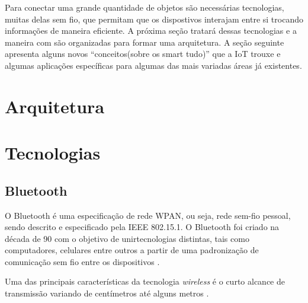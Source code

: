 Para conectar uma grande quantidade de objetos são necessárias tecnologias, muitas delas sem fio, que permitam que os dispostivos interajam entre si trocando informações de maneira eficiente. A próxima seção tratará dessas tecnologias e a maneira com são organizadas para formar uma arquitetura. A seção seguinte apresenta alguns novos ``conceitos(sobre os smart tudo)'' que a IoT trouxe e algumas aplicações específicas para algumas das mais variadas áreas já existentes.


\section{Arquitetura}


\section{Tecnologias}


\subsection{Bluetooth}

O Bluetooth é uma especificação de rede WPAN, ou seja, rede sem-fio pessoal, sendo descrito e especificado pela IEEE 802.15.1. O Bluetooth foi criado na década de 90 com o objetivo de unirtecnologias distintas, tais como computadores, celulares entre outros a partir de uma padronização de comunicação sem fio entre os dispositivos \cite{Kardach2008}. 


Uma das principais características da tecnologia \textit{wireless} é o curto alcance de transmissão variando de centímetros até alguns metros \cite{Huang2007}. 

